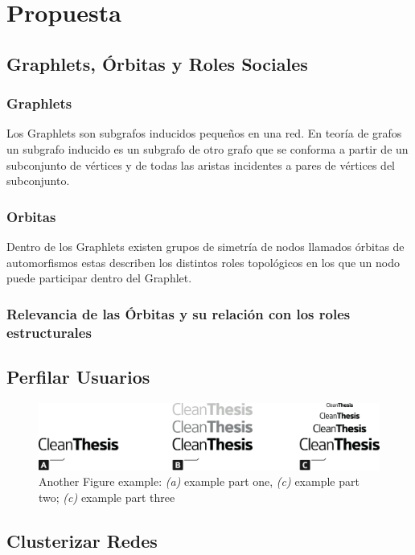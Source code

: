 %
\chapter{Propuesta}
\label{sec:system}



{
\color{gray}
\Blindtext[2][1]
}

\section{Graphlets, Órbitas y Roles Sociales}
\label{sec:system:sec1}

\subsection{Graphlets}
\label{sec:intro:results:refs:method}
{
Los Graphlets son subgrafos inducidos pequeños en una red. En teoría de grafos un subgrafo inducido es un subgrafo de otro grafo que se conforma a partir de un subconjunto de vértices y de todas las aristas incidentes a pares de vértices del subconjunto. 
}

\subsection{Orbitas}
\label{sec:intro:results:refs:method}
{
Dentro de los Graphlets existen grupos de simetría de nodos llamados órbitas de automorfismos \cite{sarajlic_graphlet-based_2016} estas describen los distintos roles topológicos en los que un nodo puede participar dentro del Graphlet.
}

\subsection{Relevancia de las Órbitas y su relación con los roles estructurales}
\label{sec:intro:results:refs:method}
{
\color{gray}
\Blindtext[1][2]
}

\section{Perfilar Usuarios}
\label{sec:system:sec2}

{
\color{gray}
\Blindtext[1][2]
}

\begin{figure}[htb]
	\includegraphics[width=\textwidth]{images/Clean-Thesis-Figure}
	\caption{Another Figure example: \textit{(a)} example part one, \textit{(c)} example part two; \textit{(c)} example part three}
	\label{fig:system:example2}
\end{figure}

{
\color{gray}
\Blindtext[2][2]
}

\section{Clusterizar Redes}
\label{sec:system:sec3}
{
\color{gray}
\Blindtext[4][2]
}